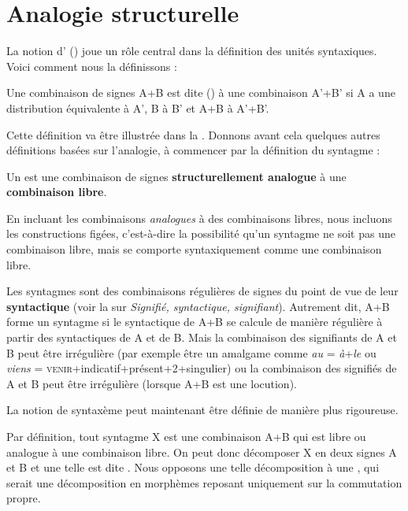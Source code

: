 \section{Analogie structurelle}\label{sec:3.1.2}

La notion d’ () joue un rôle central dans la définition des unités syntaxiques. Voici comment nous la définissons :

{Une combinaison de signes A+B est dite ()  à une combinaison A’+B’ si A a une distribution équivalente à A’, B à B’ et A+B à A’+B’.}

Cette définition va être illustrée dans la . Donnons avant cela quelques autres définitions basées sur l’analogie, à commencer par la définition du syntagme :

{Un  est une combinaison de signes \textbf{structurellement analogue} à une \textbf{combinaison libre}.}

En incluant les combinaisons \textit{analogues} à des combinaisons libres, nous incluons les constructions figées, c’est-à-dire la possibilité qu’un syntagme ne soit pas une combinaison libre, mais se comporte syntaxiquement comme une combinaison libre.

Les syntagmes sont des combinaisons régulières de signes du point de vue de leur \textbf{syntactique} (voir la  sur \textit{Signifié, syntactique, signifiant}). Autrement dit, A+B forme un syntagme si le syntactique de A+B se calcule de manière régulière à partir des syntactiques de A et de B. Mais la combinaison des signifiants de A et B peut être irrégulière (par exemple être un amalgame comme \textit{au} = \textit{à}+\textit{le} ou \textit{viens} = \textsc{venir}+indicatif+présent+2+singulier) ou la combinaison des signifiés de A et B peut être irrégulière (lorsque A+B est une locution).

La notion de syntaxème peut maintenant être définie de manière plus rigoureuse.

Par définition, tout syntagme X est une combinaison A+B qui est libre ou analogue à une combinaison libre. On peut donc décomposer X en deux signes A et B et une telle  est dite . Nous opposons une telle décomposition à une , qui serait une décomposition en morphèmes reposant uniquement sur la commutation propre.

